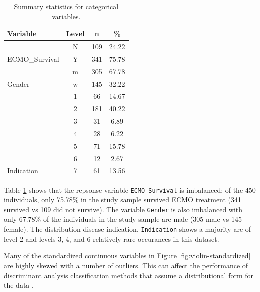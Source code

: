 \documentclass[12pt,]{article}
\begin{document}
\begin{table}[!h]

\caption{\label{tab:unnamed-chunk-3}\label{tab:categorical-summaries} Summary statistics for categorical variables.}
\centering
\fontsize{10}{12}\selectfont
\begin{tabular}{lccc}
\toprule
Variable & Level & n & \%\\
\midrule
 & N & 109 & 24.22\\

\multirow{-2}{*}{\raggedright\arraybackslash ECMO\_Survival} & Y & 341 & 75.78\\
\cmidrule{1-4}
 & m & 305 & 67.78\\

\multirow{-2}{*}{\raggedright\arraybackslash Gender} & w & 145 & 32.22\\
\cmidrule{1-4}
 & 1 & 66 & 14.67\\

 & 2 & 181 & 40.22\\

 & 3 & 31 & 6.89\\

 & 4 & 28 & 6.22\\

 & 5 & 71 & 15.78\\

 & 6 & 12 & 2.67\\

\multirow{-7}{*}{\raggedright\arraybackslash Indication} & 7 & 61 & 13.56\\
\bottomrule
\end{tabular}
\end{table}

Table \ref{tab:categorical-summaries} shows that the repsonse variable
\texttt{ECMO\_Survival} is imbalanced; of the 450 individuals, only
75.78\% in the study sample survived ECMO treatment (341 survived vs 109
did not survive). The variable \texttt{Gender} is also imbalanced with
only 67.78\% of the individuals in the study sample are male (305 male
vs 145 female). The distribution disease indication, \texttt{Indication}
shows a majority are of level 2 and levels 3, 4, and 6 relatively rare
occurances in this dataset.

Many of the standardized continuous variables in Figure
\ref{fig:violin-standardized} are highly skewed with a number of
outliers. This can affect the performance of discriminant analysis
classification methods that assume a distributional form for the data
\autocite{hastie_elements_2009}.
\end{document}
